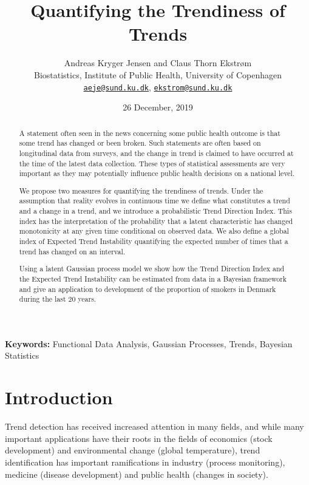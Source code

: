 \documentclass[11pt,]{article}
\title{Quantifying the Trendiness of Trends}
\author{Andreas Kryger Jensen and Claus Thorn Ekstrøm\\
Biostatistics, Institute of Public Health, University of Copenhagen\\
\href{mailto:aeje@sund.ku.dk}{\nolinkurl{aeje@sund.ku.dk}},
\href{mailto:ekstrom@sund.ku.dk}{\nolinkurl{ekstrom@sund.ku.dk}}}
\date{26 December, 2019}
\theoremstyle{nonumberplain}
\begin{document}
\maketitle

\begin{abstract}
A statement often seen in the news concerning some public health outcome is that some trend has changed or been broken. Such statements are often based on longitudinal data from surveys, and the change in trend is claimed to have occurred at the time of the latest data collection. These types of statistical assessments are very important as they may potentially influence public health decisions on a national level.

We propose two measures for quantifying the trendiness of trends. Under the assumption that reality evolves in continuous time we define what constitutes a trend and a change in a trend, and we introduce a probabilistic Trend Direction Index. This index has the interpretation of the probability that a latent characteristic has changed monotonicity at any given time conditional on observed data. We also define a global index of Expected Trend Instability quantifying the expected number of times that a trend has changed on an interval.

Using a latent Gaussian process model we show how the Trend Direction Index and the Expected Trend Instability can be estimated from data in a Bayesian framework and give an application to development of the proportion of smokers in Denmark during the last 20 years.
\end{abstract}

\begin{center}
\textbf{Keywords:} Functional Data Analysis, Gaussian Processes, Trends, Bayesian Statistics
\end{center}

\section{Introduction}\label{introduction}

Trend detection has received increased attention in many fields, and
while many important applications have their roots in the fields of
economics (stock development) and environmental change (global
temperature), trend identification has important ramifications in
industry (process monitoring), medicine (disease development) and public
health (changes in society).
\end{document}
